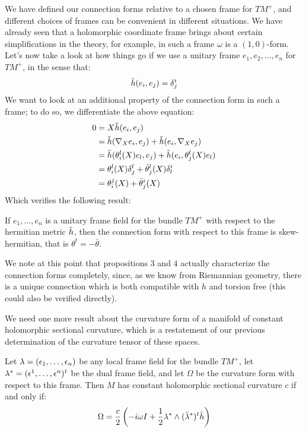 We have defined our connection forms relative to a chosen frame for $TM^{+}$, and different choices of frames can be convenient in different situations.  We have already seen that a holomorphic coordinate frame brings about certain simplifications in the theory, for example, in such a frame $\omega$ is a $(1,0)$-form.  Let's now take a look at how things go if we use a unitary frame $e_1, e_2, \ldots, e_n$ for $TM^{+}$, in the sense that:
%
$$ \tilde{h} ( e_i, e_j ) = \delta^i_j $$
%
We want to look at an additional property of the connection form in such a frame; to do so, we differentiate the above equation:
%
\begin{align*}
0 &= X \tilde{h} ( e_i, e_j ) \\
&= \tilde{h} ( \nabla_X e_i, e_j ) + \tilde{h} ( e_i, \nabla_X e_j ) \\
&= \tilde{h} ( \theta^l_i (X) e_l, e_j ) + \tilde{h} ( e_i, \theta^l_j (X) e_l ) \\
&= \theta^l_i (X) \delta^l_j + \bar{\theta}^l_j (X) \delta^i_l \\
&= \theta^j_i (X) + \bar{\theta}^i_j (X)
\end{align*}
%
Which verifies the following result:
%
\begin{prop} If $e_1, \ldots, e_n$ is a unitary frame field for the bundle $TM^{+}$ with respect to the hermitian metric $\tilde{h}$, then the connection form with respect to this frame is skew-hermitian, that is $ \theta^{t} = - \bar{ \theta } $.
\end{prop}

We note at this point that propositions $3$ and $4$ actually characterize the connection forms completely, since, as we know from Riemannian geometry, there is a unique connection which is both compatible with $h$ and torsion free (this could also be verified directly).

We need one more result about the curvature form of a manifold of constant holomorphic sectional curvature, which is a restatement of our previous determination of the curvature tensor of these spaces.

\begin{prop}  Let $\mathbf{\lambda} = (\epsilon_1, \ldots, \epsilon_n )$ be any local frame field for the bundle $TM^{+}$, let $\mathbf{\lambda}^{\ast} = ( \epsilon^1, \ldots, \epsilon^n )^{t} $ be the dual frame field, and let $\Omega$ be the curvature form with respect to this frame.  Then $M$ has constant holomorphic sectional curvature $c$ if and only if:
%
$$ \Omega = \frac{c}{2} \left( - i \omega I + \frac{1}{2} \mathbf{\lambda}^{\ast} \wedge (\bar{ \mathbf{\lambda} }^{\ast})^{t} \bar{h} \right) $$
%
\end{prop}

